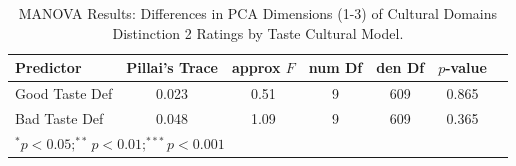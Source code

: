 \begin{table}[htpb]
\centering
\begin{tabular}{lcccccc}
\toprule
Predictor & Pillai's Trace & approx $F$ & num Df & den Df & $p$-value \\
\midrule
Good Taste Def & 0.023 & 0.51 & 9 & 609 & 0.865 \\
Bad Taste Def & 0.048 & 1.09 & 9 & 609 & 0.365 \\
\bottomrule
\multicolumn{6}{l}{\footnotesize $^{*}p<0.05; ^{**}p<0.01; ^{***}p<0.001$} \\
\end{tabular}
\caption{MANOVA Results: Differences in PCA Dimensions (1-3) of Cultural Domains Distinction 2 Ratings by Taste Cultural Model.}
\label{tab:anova_pca_distinction2}
\end{table}

